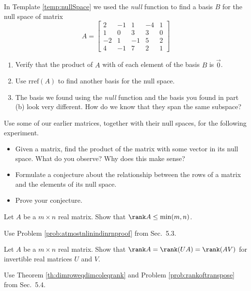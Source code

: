 \documentclass{ximera}
\begin{document}
 
\begin{problem}\label{prob_oct_Rn1}
    In Template \ref{temp:nullSpace} we used the \emph{null} function to find a basis $B$ for the null space of matrix $$A=\begin{bmatrix}2&-1&1&-4&1\\1&0&3&3&0\\-2&1&-1&5&2\\4&-1&7&2&1\end{bmatrix}$$
 
    \begin{enumerate}
        \item Verify that the product of $A$ with of each element of the basis $B$ is $\vec{0}$.
        \item Use $\text{rref}(A)$ to find another basis for the null space. 
        \item The basis we found using the \emph{null} function and the basis you found in part (b) look very different.  How do we know that they span the same subspace?
    \end{enumerate}
\end{problem}
 
\begin{problem}\label{prob_oct_Rn2}
    Use some of our earlier matrices, together with their null spaces, for the following experiment.
    \begin{itemize}
        \item Given a matrix, find the product of the matrix with some vector in its null space.  What do you observe?  Why does this make sense?
        \item Formulate a conjecture about the relationship between the rows of a matrix and the elements of its null space.
        \item Prove your conjecture.
    \end{itemize}
\end{problem}

\begin{problem}\label{prob:maxRank} 
Let $A$ be a $m\times n$ real matrix. Show that $\rank A \leq \min(m,n)$.

\begin{hint}
    Use Problem \ref{prob:atmostnlinindinrnproof} from Sec.~5.3.
\end{hint}
\end{problem}

\begin{problem}\label{prob:invariantRank} 
Let $A$ be a $m\times n$ real matrix. Show that $\rank A = \rank(UA) = \rank(AV)$ for invertible real matrices $U$ and $V$.

\begin{hint}
    Use Theorem \ref{th:dimroweqdimcoleqrank} and Problem \ref{prob:rankoftranspose} from Sec.~5.4.
\end{hint}
\end{problem}
\end{document}
